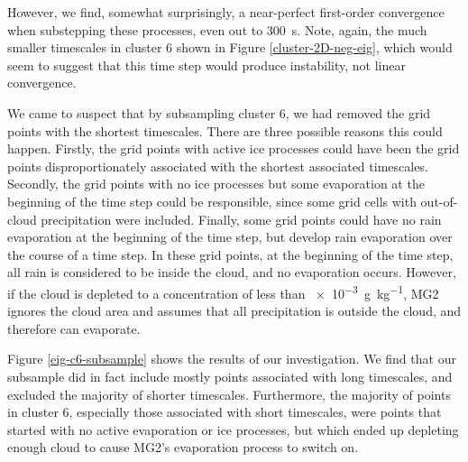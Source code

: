 \documentclass [11pt, proquest] {uwthesis}[2020/02/24]
\begin{document}
However, we find, somewhat surprisingly, a near-perfect first-order convergence when substepping these processes, even out to \SI{300}{\second}. Note, again, the much smaller timescales in cluster 6 shown in Figure \ref{cluster-2D-neg-eig}, which would seem to suggest that this time step would produce instability, not linear convergence.

We came to suspect that by subsampling cluster 6, we had removed the grid points with the shortest timescales. There are three possible reasons this could happen. Firstly, the grid points with active ice processes could have been the grid points disproportionately associated with the shortest associated timescales. Secondly, the grid points with no ice processes but some evaporation at the beginning of the time step could be responsible, since some grid cells with out-of-cloud precipitation were included. Finally, some grid points could have no rain evaporation at the beginning of the time step, but develop rain evaporation over the course of a time step. In these grid points, at the beginning of the time step, all rain is considered to be inside the cloud, and no evaporation occurs. However, if the cloud is depleted to a concentration of less than \SI{e-3}{\gram\per\kilo\gram}, MG2 ignores the cloud area and assumes that all precipitation is outside the cloud, and therefore can evaporate.

Figure \ref{eig-c6-subsample} shows the results of our investigation. We find that our subsample did in fact include mostly points associated with long timescales, and excluded the majority of shorter timescales. Furthermore, the majority of points in cluster 6, especially those associated with short timescales, were points that started with no active evaporation or ice processes, but which ended up depleting enough cloud to cause MG2's evaporation process to switch on.
\end{document}
